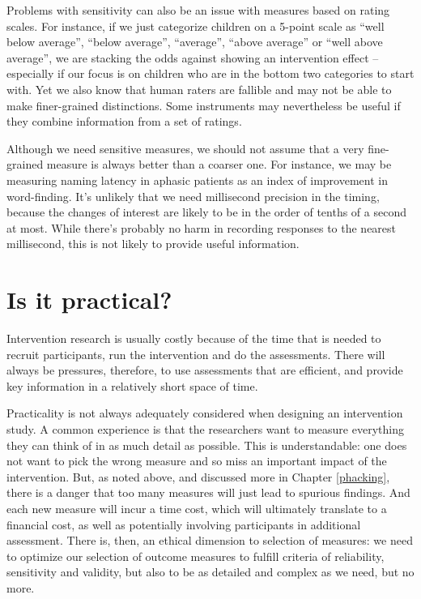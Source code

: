 \documentclass{krantz}
\begin{document}
Problems with sensitivity can also be an issue with measures based on rating scales. For instance, if we just categorize children on a 5-point scale as ``well below average'', ``below average'', ``average'', ``above average'' or ``well above average'', we are stacking the odds against showing an intervention effect -- especially if our focus is on children who are in the bottom two categories to start with. Yet we also know that human raters are fallible and may not be able to make finer-grained distinctions. Some instruments may nevertheless be useful if they combine information from a set of ratings.

Although we need sensitive measures, we should not assume that a very fine-grained measure is always better than a coarser one. For instance, we may be measuring naming latency in aphasic patients as an index of improvement in word-finding. It's unlikely that we need millisecond precision in the timing, because the changes of interest are likely to be in the order of tenths of a second at most. While there's probably no harm in recording responses to the nearest millisecond, this is not likely to provide useful information.

\hypertarget{is-it-practical}{%
\section{Is it practical?}\label{is-it-practical}}

Intervention research is usually costly because of the time that is needed to recruit participants, run the intervention and do the assessments. There will always be pressures, therefore, to use assessments that are efficient, and provide key information in a relatively short space of time.

Practicality is not always adequately considered when designing an intervention study. A common experience is that the researchers want to measure everything they can think of in as much detail as possible. This is understandable: one does not want to pick the wrong measure and so miss an important impact of the intervention. But, as noted above, and discussed more in Chapter \ref{phacking}, there is a danger that too many measures will just lead to spurious findings. And each new measure will incur a time cost, which will ultimately translate to a financial cost, as well as potentially involving participants in additional assessment. There is, then, an ethical dimension to selection of measures: we need to optimize our selection of outcome measures to fulfill criteria of reliability, sensitivity and validity, but also to be as detailed and complex as we need, but no more.
\end{document}
